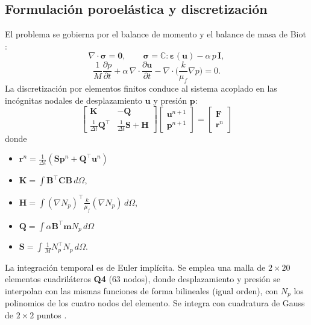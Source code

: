 \documentclass[twocolumn, a4paper]{article}
\begin{document}
    \subsection{Formulación poroelástica y discretización}
    \quad El problema se gobierna por el balance de momento y el balance de masa de
    Biot \cite{biot1941}:
    \begin{equation}
    \nabla\!\cdot\!\bm{\sigma}=\bm{0},\qquad
    \bm{\sigma}=\mathbb{C}:\bm{\varepsilon}(\bm{u})-\alpha\,p\,\bm{I},
    \end{equation}
    \begin{equation}
    \frac{1}{M}\frac{\partial p}{\partial t}
    +\alpha\,\nabla\!\cdot\!\frac{\partial \bm{u}}{\partial t}
    -\nabla\!\cdot\!\Big(\frac{k}{\mu_f}\nabla p\Big)=0 .
    \end{equation}
    La discretización por elementos finitos \cite{bathe2006} conduce al sistema
    acoplado en las incógnitas nodales de desplazamiento $\bm{u}$ y presión
    $\bm{p}$:
    \begin{equation}
    \begin{bmatrix} \bm{K} & -\bm{Q}\\[2pt] \tfrac{1}{\Delta t}\bm{Q}^{\!\top} & \tfrac{1}{\Delta t}\bm{S}+\bm{H}\end{bmatrix}
    \!\begin{bmatrix}\bm{u}^{n+1}\\[2pt]\bm{p}^{n+1}\end{bmatrix}
    =\begin{bmatrix}\bm{F}\\[2pt]\bm{r}^{n}\end{bmatrix}
    \label{eq:monolitico}
    \end{equation}
    donde 
    \begin{itemize}
    \item$\bm{r}^{n}=\tfrac{1}{\Delta t}(\bm{S}\bm{p}^{n}+\bm{Q}^{\!\top}\bm{u}^{n})$
    \item $\bm{K}=\!\int\!\bm{B}^{\!\top}\mathbf{C}\bm{B}\,d\Omega$,
    \item$\bm{H}=\!\int\!(\nabla N_p)^{\!\top}\tfrac{k}{\mu_f}(\nabla N_p)\,d\Omega$,
    \item$\bm{Q}=\!\int\!\alpha\bm{B}^{\!\top}\!\bm{m}N_p\,d\Omega$
    \item$\bm{S}=\!\int\!\tfrac{1}{M}N_p^{\!\top}N_p\,d\Omega$. 
    \end{itemize}
    La integración temporal es
    de Euler implícita. Se emplea una malla de $2\times20$ elementos
    cuadriláteros \textbf{Q4} ($63$ nodos), donde desplazamiento y presión se
    interpolan con las mismas funciones de forma bilineales (igual orden), con
    $N_p$ los polinomios de los cuatro nodos del elemento. Se integra con
    cuadratura de Gauss de $2\times2$ puntos \cite{cook2002}.
\end{document}
